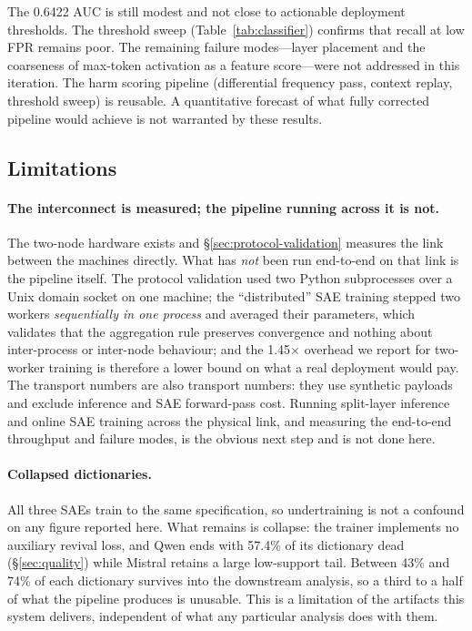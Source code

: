 \documentclass[11pt]{article}
\begin{document}
The 0.6422 AUC is still modest and not close to actionable deployment thresholds. The threshold sweep (Table~\ref{tab:classifier}) confirms that recall at low FPR remains poor. The remaining failure modes---layer placement and the coarseness of max-token activation as a feature score---were not addressed in this iteration. The harm scoring pipeline (differential frequency pass, context replay, threshold sweep) is reusable. A quantitative forecast of what fully corrected pipeline would achieve is not warranted by these results.

\subsection{Limitations}
\label{sec:limitations}

\paragraph{The interconnect is measured; the pipeline running across it is not.} The two-node hardware exists and \S\ref{sec:protocol-validation} measures the link between the machines directly. What has \emph{not} been run end-to-end on that link is the pipeline itself. The protocol validation used two Python subprocesses over a Unix domain socket on one machine; the ``distributed'' SAE training stepped two workers \emph{sequentially in one process} and averaged their parameters, which validates that the aggregation rule preserves convergence and nothing about inter-process or inter-node behaviour; and the 1.45$\times$ overhead we report for two-worker training is therefore a lower bound on what a real deployment would pay. The transport numbers are also transport numbers: they use synthetic payloads and exclude inference and SAE forward-pass cost. Running split-layer inference and online SAE training across the physical link, and measuring the end-to-end throughput and failure modes, is the obvious next step and is not done here.

\paragraph{Collapsed dictionaries.} All three SAEs train to the same specification, so undertraining is not a confound on any figure reported here. What remains is collapse: the trainer implements no auxiliary revival loss, and Qwen ends with 57.4\% of its dictionary dead (\S\ref{sec:quality}) while Mistral retains a large low-support tail. Between 43\% and 74\% of each dictionary survives into the downstream analysis, so a third to a half of what the pipeline produces is unusable. This is a limitation of the artifacts this system delivers, independent of what any particular analysis does with them.
\end{document}
